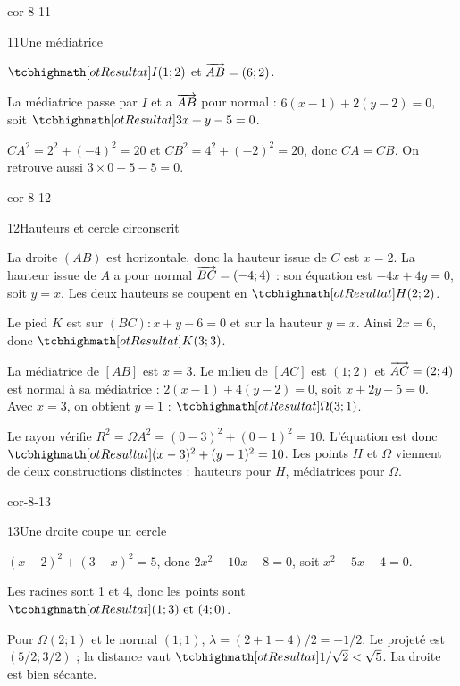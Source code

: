 \begin{blocLivre}{cor-8-11}
\begin{corrige}{11}{Une médiatrice}
\begin{questions}
\item $\res{I(1;2)}$ et $\overrightarrow{AB}=(6;2)$.
\item La médiatrice passe par $I$ et a $\overrightarrow{AB}$ pour normal : $6(x-1)+2(y-2)=0$, soit $\res{3x+y-5=0}$.
\item $CA^2=2^2+(-4)^2=20$ et $CB^2=4^2+(-2)^2=20$, donc $CA=CB$. On retrouve aussi $3\times0+5-5=0$.
\end{questions}

\label{figgeo-08-11-cor}
\end{corrige}
\end{blocLivre}
\begin{blocLivre}{cor-8-12}
\begin{corrige}{12}{Hauteurs et cercle circonscrit}
\begin{questions}
\item La droite $(AB)$ est horizontale, donc la hauteur issue de $C$ est $x=2$.
La hauteur issue de $A$ a pour normal $\overrightarrow{BC}=(-4;4)$ : son équation est $-4x+4y=0$, soit $y=x$.
Les deux hauteurs se coupent en $\res{H(2;2)}$.
\item Le pied $K$ est sur $(BC):x+y-6=0$ et sur la hauteur $y=x$.
Ainsi $2x=6$, donc $\res{K(3;3)}$.
\item La médiatrice de $[AB]$ est $x=3$.
Le milieu de $[AC]$ est $(1;2)$ et $\overrightarrow{AC}=(2;4)$ est normal à sa médiatrice :
$2(x-1)+4(y-2)=0$, soit $x+2y-5=0$.
Avec $x=3$, on obtient $y=1$ : $\res{\Omega(3;1)}$.
\item Le rayon vérifie $R^2=\Omega A^2=(0-3)^2+(0-1)^2=10$.
L’équation est donc $\res{(x-3)^2+(y-1)^2=10}$.
Les points $H$ et $\Omega$ viennent de deux constructions distinctes : hauteurs pour $H$, médiatrices pour $\Omega$.
\end{questions}
\label{figgeo-08-12-cor}
\end{corrige}
\end{blocLivre}
\begin{blocLivre}{cor-8-13}
\begin{corrige}{13}{Une droite coupe un cercle}
\begin{questions}
\item $(x-2)^2+(3-x)^2=5$, donc $2x^2-10x+8=0$, soit $x^2-5x+4=0$.
\item Les racines sont 1 et 4, donc les points sont $\res{(1;3)\text{ et }(4;0)}$.
\item Pour $\Omega(2;1)$ et le normal $(1;1)$, $\lambda=(2+1-4)/2=-1/2$. Le projeté est $(5/2;3/2)$ ; la distance vaut $\res{1/\sqrt2}<\sqrt5$. La droite est bien sécante.
\end{questions}

\label{figgeo-08-13-cor}
\end{corrige}
\end{blocLivre}
